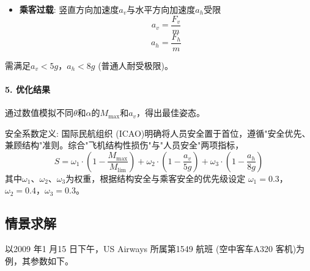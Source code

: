 \documentclass{cumcmthesis}
\begin{document}
\begin{itemize}

\item \textbf{乘客过载}: 竖直方向加速度$a_v$与水平方向加速度$a_h$受限
\begin{equation}
a_v = \frac{F_v}{m} 
\label{a_v}
\end{equation}
\begin{equation}
a_h = \frac{F_h}{m} 
\label{a_h}
\end{equation}

\end{itemize}
 
需满足$a_v < 5g$，$a_h < 8g$ (普通人耐受极限)。


\paragraph{5. 优化结果}

通过数值模拟不同$\theta$和$\alpha$的$M_{\text{max}}$和$a_v$，得出最佳姿态。

安全系数定义: 国际民航组织 (ICAO)明确将人员安全置于首位，遵循"安全优先、兼顾结构"准则。综合"飞机结构性损伤"与"人员安全"两项指标，
\begin{equation}
S = \omega_1 \cdot \left(1 - \frac{M_{\text{max}}}{M_{\text{lim}}}\right) + 
\omega_2 \cdot \left(1 - \frac{a_v}{5g}\right) + 
\omega_3 \cdot \left(1 - \frac{a_h}{8g}\right)
\label{FormulaOfS}
\end{equation}
其中$\omega_1$、$\omega_2$、$\omega_3$为权重，根据结构安全与乘客安全的优先级设定
$\omega_1=0.3$，$\omega_2=0.4$，$\omega_3=0.3$。


\subsection{情景求解}

以2009 年1 月15 日下午，US Airways 所属第1549 航班 (空中客车A320 客机)为例，其参数如下。
\end{document}
